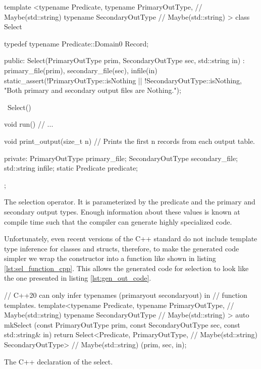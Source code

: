 \begin{code}
\begin{cppcode}
template <typename Predicate,
          typename PrimaryOutType,   // Maybe(std::string)
          typename SecondaryOutType  // Maybe(std::string)
          >
class Select {
  typedef typename Predicate::Domain0 Record;

public:
  Select(PrimaryOutType prim, SecondaryOutType sec, std::string in)
    : primary_file(prim), secondary_file(sec), infile(in) {
    static_assert(!PrimaryOutType::isNothing || !SecondaryOutType::isNothing,
                  "Both primary and secondary output files are Nothing.");
  }

  ~Select() {}

  void run() {
    // ...
  }

  void print_output(size_t n) {
    // Prints the first n records from each output table.
  }

private:
  PrimaryOutType primary_file;
  SecondaryOutType secondary_file;
  std::string infile;
  static Predicate predicate;
};
\end{cppcode}
  \caption{\label{lst:sel_operator_cpp}The selection operator. It is
    parameterized by the predicate and the primary and secondary
    output types. Enough information about these values is known at
    compile time such that the compiler can generate highly
    specialized code.}
\end{code}

Unfortunately, even recent versions of the C++ standard do not
include template type inference for classes and structs, therefore, to
make the generated code simpler we wrap the constructor into a
function like shown in listing \ref{lst:sel_function_cpp}. This allows the
generated code for selection to look like the one presented in listing
\ref{lst:gen_out_code}.

\begin{code}
\begin{cppcode}
// C++20 can only infer typenames (primaryout secondaryout) in
// function templates.
template<typename Predicate,
         typename PrimaryOutType,   // Maybe(std::string)
         typename SecondaryOutType  // Maybe(std::string)
         >
auto mkSelect (const PrimaryOutType prim,
               const SecondaryOutType sec,
               const std::string& in) {
  return Select<Predicate,
                PrimaryOutType,   // Maybe(std::string)
                SecondaryOutType> // Maybe(std::string)
    (prim, sec, in);
}
\end{cppcode}
\caption{\label{lst:sel_function_cpp}The C++ declaration of the select.}
\end{code}


